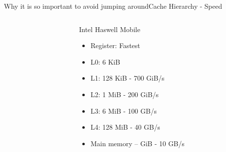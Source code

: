 \documentclass[10pt,aspectratio=169]{beamer}
\begin{document}
\begin{frame}{Why it is so important to avoid jumping around}{Cache Hierarchy - Speed}
\begin{columns}
\begin{column}{0.33\textwidth}
        \end{column}

        \begin{column}{0.3\textwidth}
            Intel Haswell Mobile 
            \begin{itemize}
                \item Register: Fastest
                \item L0: 6 KiB
                \item L1: 128 KiB - 700 GiB/s
                \item L2: 1 MiB - 200 GiB/s
                \item L3: 6 MiB - 100 GB/s
                \item L4: 128 MiB - 40 GB/s
                \item Main memory – GiB - 10 GB/s
            \end{itemize}
        \end{column}

    \end{columns}
\end{frame}
\end{document}
